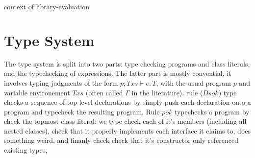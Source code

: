 \begin{bnf}
  {context of library-evaluation}\\           {}%
\end{bnf}



\section{Type System}

The type system is split into two parts: type checking programs and class literals, and the typechecking of expressions. The latter part is mostly convential, it involves typing judgments of the form $p; Txs \vdash e : T$, with the usual program $p$ and variable environement $Txs$ (often called $\Gamma$ in the literature). rule ($Ds ok$) type checks a sequence of top-level declarations by simply push each declaration onto a program and typecheck the resulting program.
Rule $p ok$ typechecks a program by check the topmost class literal: we type check each of it’s members (including all nested classes), check that it properly implements each interface it claims to, does something weird, and finanly check check that it’s constructor only referenced existing types,

